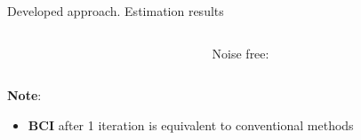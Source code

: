 \documentclass[../main.tex]{subfiles}
\begin{document}
\begin{frame}[t]{Developed approach. Estimation results}
\begin{columns}[t]
\begin{column}{0.4\textwidth}

\end{column}

\begin{column}{0.6\textwidth}
\centering
{}
	{
		Noise free:
			\centering
			\begin{adjustbox}{width=1\columnwidth}
			
			\end{adjustbox}
	}

% 			

\end{column}

\end{columns}

{
	\textbf{Note}:
	\begin{itemize}
		\item \textbf{BCI} after 1 iteration is equivalent to conventional methods
	\end{itemize}	
}

\end{frame}


%
%
\end{document}
